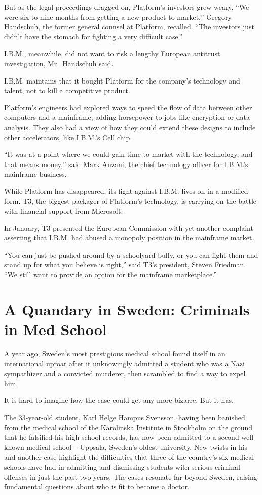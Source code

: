 \documentclass[12pt,a4paper,onecolumn]{article}
\begin{document}
\begin{CJK*}{GBK}{song}
But as the legal proceedings dragged on, Platform's investors grew weary. ``We were six to nine
months from getting a new product to market,'' Gregory Handschuh, the former general counsel at
Platform, recalled. ``The investors just didn't have the stomach for fighting a very difficult
case.''

I.B.M., meanwhile, did not want to risk a lengthy European antitrust investigation, Mr.~Handschuh
said.

I.B.M. maintains that it bought Platform for the company's technology and talent, not to kill a
competitive product.

Platform's engineers had explored ways to speed the flow of data between other computers and a
mainframe, adding horsepower to jobs like encryption or data analysis. They also had a view of how
they could extend these designs to include other accelerators, like I.B.M.'s Cell chip.

``It was at a point where we could gain time to market with the technology, and that means money,''
said Mark Anzani, the chief technology officer for I.B.M.'s mainframe business.

While Platform has disappeared, its fight against I.B.M. lives on in a modified form. T3, the
biggest packager of Platform's technology, is carrying on the battle with financial support from
Microsoft.

In January, T3 presented the European Commission with yet another complaint asserting that I.B.M.
had abused a monopoly position in the mainframe market.

``You can just be pushed around by a schoolyard bully, or you can fight them and stand up for what
you believe is right,'' said T3's president, Steven Friedman. ``We still want to provide an option
for the mainframe marketplace.''

\section{A Quandary in Sweden: Criminals in Med School}

A year ago, Sweden's most prestigious medical school found itself in an international uproar after
it unknowingly admitted a student who was a Nazi sympathizer and a convicted murderer, then
scrambled to find a way to expel him.

It is hard to imagine how the case could get any more bizarre. But it has.

The 33-year-old student, Karl Helge Hampus Svensson, having been banished from the medical school of
the Karolinska Institute in Stockholm on the ground that he falsified his high school records, has
now been admitted to a second well-known medical school -- Uppsala, Sweden's oldest university. New
twists in his and another case highlight the difficulties that three of the country's six medical
schools have had in admitting and dismissing students with serious criminal offenses in just the
past two years. The cases resonate far beyond Sweden, raising fundamental questions about who is fit
to become a doctor.


\end{CJK*}
\end{document}
